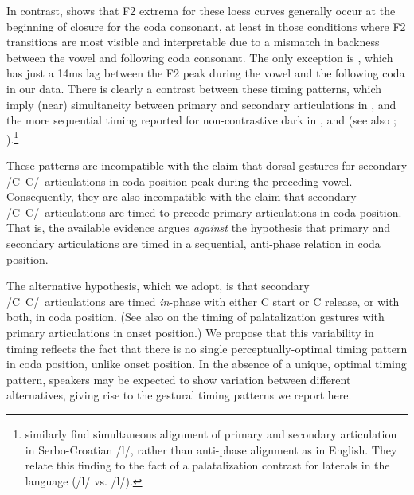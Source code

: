 \documentclass[output=paper,colorlinks,citecolor=brown]{langscibook}
\newcommand{\pal}{\ipa{ʲ}}
\newcommand{\vel}{\ipa{ˠ}}
\newcommand{\palvelcon}{/C\vel\ C\pal/}
\begin{document}
In contrast,  shows that F2 extrema for these loess curves generally occur at the beginning of closure for the coda consonant, at least in those conditions where F2 transitions are most visible and interpretable due to a mismatch in backness between the vowel and following coda consonant. The only exception is , which has just a 14ms lag between the F2 peak during the vowel and the following coda  in our data. There is clearly a contrast between these timing patterns, which imply (near) simultaneity between primary and secondary articulations in , and the more sequential timing reported for non-contrastive dark \ipa{[ɫ]} in \citet{Sproat_Fujimura1993_l-allophony}, and \citet{Gick_etal:2006_liquids} (see also \cite{Browman_Goldstein1995_gestural_syll_position}; \cite{Krakow1999_physiological_syllables}).\footnote{\citet{Gick_etal:2006_liquids} similarly find simultaneous alignment of primary and secondary articulation in Serbo-Croatian /l\vel/, rather than anti-phase alignment as in English. They relate this finding to the fact of a palatalization contrast for laterals in the language (/l\vel/ vs. /l\pal/).\label{fn:serb}}

These patterns are incompatible with the claim that dorsal gestures for secondary \palvelcon\ articulations in coda position peak during the preceding vowel. Consequently, they are also incompatible with the claim that secondary \palvelcon\ articulations are timed to precede primary articulations in coda position. That is, the available evidence argues \emph{against} the hypothesis that primary and secondary articulations are timed in a sequential, anti-phase relation in coda position.

The alternative hypothesis, which we adopt, is that secondary \palvelcon\ articulations are timed \emph{in}-phase with either C start or C release, or with both, in coda position. (See also \citealt{Shaw_etal2021_complex_segments} on the timing of palatalization gestures with primary articulations in onset position.) We propose that this variability in timing reflects the fact that there is no single perceptually-optimal timing pattern in coda position, unlike onset position. In the absence of a unique, optimal timing pattern, speakers may be expected to show variation between different alternatives, giving rise to the gestural timing patterns we report here.
\end{document}
